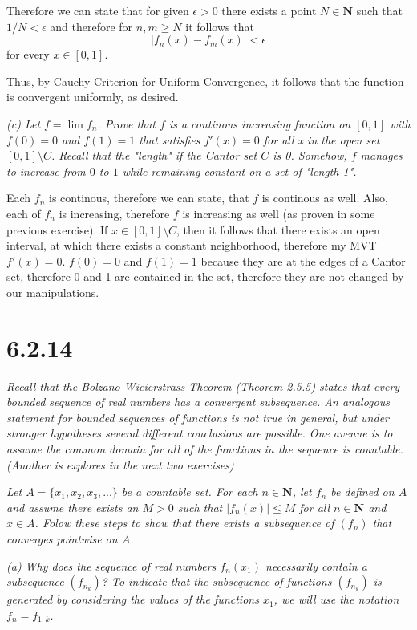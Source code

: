 \documentclass[11pt,oneside,titlepage]{book}
\begin{document}
Therefore we can state that for given $\epsilon > 0$ there exists a
point $N \in \textbf{N}$ such that $1/N < \epsilon$ and therefore
for $n, m \geq N$ it follows that 
$$|f_n(x) - f_m(x)| < \epsilon$$
for every $x \in [0, 1]$.

Thus, by Cauchy Criterion for Uniform Convergence, it follows that the
function is convergent uniformly, as desired.

\textit{(c) Let $f = \lim{f_n}$. Prove that $f$ is a continous increasing
  function on $[0, 1]$ with $f(0) = 0$ and $f(1) = 1$ that satisfies
  $f'(x) = 0$ for all x in the open set $[0, 1] \setminus C$. Recall that the
  "length" if the Cantor set $C$ is 0. Somehow, $f$ manages to increase from
  $0$ to $1$ while remaining constant on a set of "length 1".}

Each $f_n$ is continous, therefore we can state, that $f$ is continous as well.
Also, each of $f_n$ is increasing, therefore $f$ is increasing as well (as
proven in some previous exercise). If $x \in [0, 1] \setminus C$, then it
follows that there exists an open interval, at which there exists a constant
neighborhood, therefore my MVT $f'(x) = 0$. $f(0) = 0$ and $f(1) = 1$
because they are at the edges of a Cantor set, therefore 0 and 1 are
contained in the set, therefore they are
not changed by our manipulations.

\section*{6.2.14}
\textit{Recall that the Bolzano-Wieierstrass Theorem (Theorem 2.5.5) states
  that every bounded sequence of real numbers has a convergent subsequence. An
  analogous statement for bounded sequences of functions is not true in
  general, but under stronger hypotheses several different conclusions are
  possible. One avenue is to assume the common domain for all of the functions
  in the sequence is countable. (Another is explores in the next two
  exercises)}

\textit{Let $A = \{x_1, x_2, x_3, ... \}$ be a countable set. For each
  $n \in \textbf{N}$, let $f_n$ be defined on $A$ and assume there exists an
  $M > 0$ such that $|f_n(x)| \leq M$ for all $n \in \textbf{N}$ and
  $x \in A$. Folow these steps to show that there exists a subsequence of
  $(f_n)$ that converges pointwise on $A$.}

\textit{(a) Why does the sequence of real numbers $f_n(x_1)$ necessarily
  contain a subsequence $(f_{n_k})$? To indicate that the subsequence of
  functions $(f_{n_k})$ is generated by considering the values of the functions
  $x_1$, we will use the notation $f_n = f_{1,k}$.}
\end{document}
